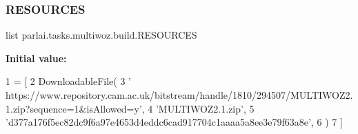 \subsubsection{\texorpdfstring{R\+E\+S\+O\+U\+R\+C\+ES}{RESOURCES}}
{\footnotesize\ttfamily list parlai.\+tasks.\+multiwoz.\+build.\+R\+E\+S\+O\+U\+R\+C\+ES}

{\bfseries Initial value\+:}
\begin{DoxyCode}
1 =  [
2     DownloadableFile(
3         \textcolor{stringliteral}{'
      https://www.repository.cam.ac.uk/bitstream/handle/1810/294507/MULTIWOZ2.1.zip?sequence=1&isAllowed=y'},
4         \textcolor{stringliteral}{'MULTIWOZ2.1.zip'},
5         \textcolor{stringliteral}{'d377a176f5ec82dc9f6a97e4653d4eddc6cad917704c1aaaa5a8ee3e79f63a8e'},
6     )
7 ]
\end{DoxyCode}
